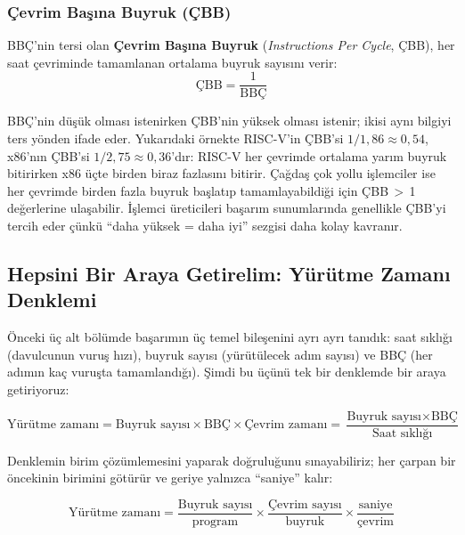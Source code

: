 \subsubsection*{Çevrim Başına Buyruk (ÇBB)}

BBÇ'nin tersi olan \textbf{Çevrim Başına Buyruk} (\emph{Instructions Per Cycle}, ÇBB), her saat çevriminde tamamlanan ortalama buyruk sayısını verir:
\begin{equation}
\text{ÇBB} = \frac{1}{\text{BBÇ}}
\label{eq:cbb}
\end{equation}

\noindent BBÇ'nin düşük olması istenirken ÇBB'nin yüksek olması istenir; ikisi aynı bilgiyi ters yönden ifade eder. Yukarıdaki örnekte RISC-V'in ÇBB'si $1/1{,}86 \approx 0{,}54$, x86'nın ÇBB'si $1/2{,}75 \approx 0{,}36$'dır: RISC-V her çevrimde ortalama yarım buyruk bitirirken x86 üçte birden biraz fazlasını bitirir. Çağdaş çok yollu işlemciler ise her çevrimde birden fazla buyruk başlatıp tamamlayabildiği için ÇBB\,$>$\,1 değerlerine ulaşabilir. İşlemci üreticileri başarım sunumlarında genellikle ÇBB'yi tercih eder çünkü ``daha yüksek = daha iyi'' sezgisi daha kolay kavranır.

\subsection{Hepsini Bir Araya Getirelim: Yürütme Zamanı Denklemi}
\label{subsec:yurutme-zamani-denklemi}

Önceki üç alt bölümde başarımın üç temel bileşenini ayrı ayrı tanıdık: saat sıklığı (davulcunun vuruş hızı), buyruk sayısı (yürütülecek adım sayısı) ve BBÇ (her adımın kaç vuruşta tamamlandığı). Şimdi bu üçünü tek bir denklemde bir araya getiriyoruz:

\begin{equation}
\text{Yürütme zamanı} = \text{Buyruk sayısı} \times \text{BBÇ} \times \text{Çevrim zamanı} = \frac{\text{Buyruk sayısı} \times \text{BBÇ}}{\text{Saat sıklığı}}
\label{eq:yurutme-zamani-bbc}
\end{equation}

Denklemin birim çözümlemesini yaparak doğruluğunu sınayabiliriz; her çarpan bir öncekinin birimini götürür ve geriye yalnızca ``saniye'' kalır:

\begin{equation}
\text{Yürütme zamanı} = \frac{\text{Buyruk sayısı}}{\text{program}} \times \frac{\text{Çevrim sayısı}}{\text{buyruk}} \times \frac{\text{saniye}}{\text{çevrim}}
\label{eq:yurutme-birim}
\end{equation}

